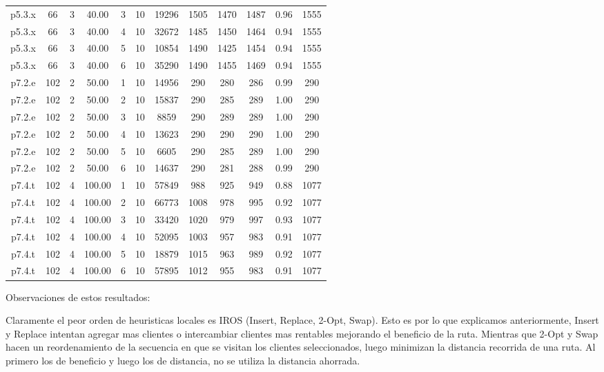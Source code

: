 \begin{center}
\begin{tabular}{ |c|c|c|c|c|c|c|c|c|c|c|c| }
p5.3.x & 66 & 3 & 40.00 & 3 & 10 & 19296 & 1505 & 1470 & 1487 & 0.96 & 1555  \\
p5.3.x & 66 & 3 & 40.00 & 4 & 10 & 32672 & 1485 & 1450 & 1464 & 0.94 & 1555  \\
p5.3.x & 66 & 3 & 40.00 & 5 & 10 & 10854 & 1490 & 1425 & 1454 & 0.94 & 1555  \\
p5.3.x & 66 & 3 & 40.00 & 6 & 10 & 35290 & 1490 & 1455 & 1469 & 0.94 & 1555  \\
p7.2.e & 102 & 2 & 50.00 & 1 & 10 & 14956 & 290 & 280 & 286 & 0.99 & 290  \\
p7.2.e & 102 & 2 & 50.00 & 2 & 10 & 15837 & 290 & 285 & 289 & 1.00 & 290  \\
p7.2.e & 102 & 2 & 50.00 & 3 & 10 & 8859 & 290 & 289 & 289 & 1.00 & 290  \\
p7.2.e & 102 & 2 & 50.00 & 4 & 10 & 13623 & 290 & 290 & 290 & 1.00 & 290  \\
p7.2.e & 102 & 2 & 50.00 & 5 & 10 & 6605 & 290 & 285 & 289 & 1.00 & 290  \\
p7.2.e & 102 & 2 & 50.00 & 6 & 10 & 14637 & 290 & 281 & 288 & 0.99 & 290  \\
p7.4.t & 102 & 4 & 100.00 & 1 & 10 & 57849 & 988 & 925 & 949 & 0.88 & 1077  \\
p7.4.t & 102 & 4 & 100.00 & 2 & 10 & 66773 & 1008 & 978 & 995 & 0.92 & 1077  \\
p7.4.t & 102 & 4 & 100.00 & 3 & 10 & 33420 & 1020 & 979 & 997 & 0.93 & 1077  \\
p7.4.t & 102 & 4 & 100.00 & 4 & 10 & 52095 & 1003 & 957 & 983 & 0.91 & 1077  \\
p7.4.t & 102 & 4 & 100.00 & 5 & 10 & 18879 & 1015 & 963 & 989 & 0.92 & 1077  \\
p7.4.t & 102 & 4 & 100.00 & 6 & 10 & 57895 & 1012 & 955 & 983 & 0.91 & 1077  \\
\hline
\end{tabular}
\end{center}

\bigskip

Observaciones de estos resultados:

\bigskip

Claramente el peor orden de heuristicas locales es IROS (Insert, Replace, 2-Opt, Swap). Esto es por lo que explicamos anteriormente, Insert y Replace intentan agregar mas clientes o intercambiar clientes mas rentables mejorando el beneficio de la ruta. Mientras que 2-Opt y Swap hacen un reordenamiento de la secuencia en que se visitan los clientes seleccionados, luego minimizan la distancia recorrida de una ruta. Al primero los de beneficio y luego los de distancia, no se utiliza la distancia ahorrada.

